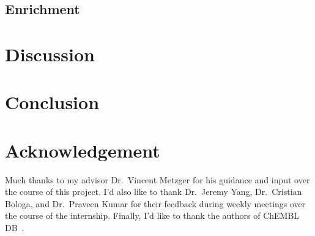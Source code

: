 \documentclass[11pt]{article}
\begin{document}
\subsection*{Enrichment}

\section*{Discussion}

\section*{Conclusion}


\section*{Acknowledgement}
Much thanks to my advisor Dr.~Vincent Metzger for his guidance and input over the course of this project. I'd also like to thank Dr.~Jeremy Yang, Dr.~Cristian Bologa, and Dr.~Praveen Kumar for their feedback during weekly meetings over the course of the internship. Finally, I'd like to thank the   authors of ChEMBL DB~\cite{chembl_db_2023}.


\end{document}

